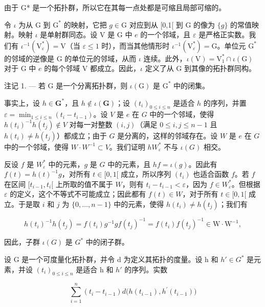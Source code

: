 由于 G* 是一个拓扑群，所以它在其每一点处都是可缩且局部可缩的。

令 \(\iota\) 为从 G 到 \(\mathrm{G}^*\) 的映射，它把 \(g\in \mathrm{G}\) 对应到从 [0,1[ 到 G 的像为 \(\{g\}\) 的常值映射。映射 \(\iota\) 是单射群同态。设 V 是 G 中 \(e\) 的一个邻域，且 \(\varepsilon\) 是严格正实数。我们有 \(\iota^{-1}(\mathrm{V}_{\varepsilon}^{*}) = \mathrm{V}\)（当 \(\varepsilon \leqslant 1\) 时），而当其他情形时 \(\iota^{-1}(\mathrm{V}_{\varepsilon}^{*}) = \mathrm{G}\)。单位元 \(\mathrm{G}^*\) 的邻域的逆像是 G 的单位元的邻域，从而 \(\iota\) 连续。此外，\(\iota(\mathrm{V}) = \mathrm{V}_1^* \cap \iota(\mathrm{G})\) 对于 G 中 \(e\) 的每个邻域 V 都成立。因此，\(\iota\) 定义了从 G 到其像的拓扑群同构。

注记 1. --- 若 G 是一个分离拓扑群，则 \(\iota(\mathrm{G})\) 是 \(\mathrm{G}^*\) 中的闭集。

事实上，设 \(h \in \mathbf{G}^*\)，且 \(h \notin \iota(\mathbf{G})\)；设 \((t_i)_{0 \leqslant i \leqslant n}\) 是适合 \(h\) 的序列，并置 \(\varepsilon = \min_{1 \leqslant i \leqslant n} (t_i - t_{i-1})\)。设 \(V\) 是 \(e\) 在 \(G\) 中的一个邻域，使得 \(h(t_i)^{-1}h(t_j) \notin V\) 对每一对整数 \((i,j)\)（满足 \(0 \leqslant i, j \leqslant n-1\) 且 \(h(t_i) \neq h(t_j)\)）都成立；由于 \(G\) 是分离的，这样的邻域存在。设 \(W\) 是 \(e\) 在 \(G\) 中的一个邻域，使得 \(W \cdot W^{-1} \subset V\)。我们证明 \(hW_\varepsilon^*\) 不与 \(\iota(G)\) 相交。

反设 \(f\) 是 \(W_{\varepsilon}^{*}\) 中的元素，\(g\) 是 \(G\) 中的元素，且 \(hf = \iota(g)\)。因此有 \(f(t) = h(t)^{-1}g\)，对所有 \(t \in [0,1[\) 成立，所以序列 \((t_i)\) 也适合函数 \(f\)。若 \(f\) 在区间 \([t_{i-1}, t_i[\) 上所取的值不属于 \(W\)，则有 \(t_i - t_{i-1} < \varepsilon\)，因为 \(f \in W_{\varepsilon}^{*}\)。但根据 \(\varepsilon\) 的定义，这个不等式不可能成立；因此都有 \(f(t) \in W\)，对于所有 \(t \in [0,1[\) 成立。于是取 \(i\) 和 \(j\) 为 \(\{0, \ldots, n-1\}\) 中的元素，使得 \(h(t_i) \neq h(t_j)\)；我们有

\[
h (t _ {i}) ^ {- 1} h (t _ {j}) = f (t _ {i}) g ^ {- 1} g f (t _ {j}) ^ {- 1} = f (t _ {i}) f (t _ {j}) ^ {- 1} \in \mathrm{W} \cdot \mathrm{W} ^ {- 1},
\]

因此，子群 \(\iota(G)\) 是 \(G^{*}\) 中的闭子群。

设 G 是一个可度量化拓扑群，并令 d 为定义其拓扑的度量。设 h 和 \(h' \in G^{*}\) 是元素，并设 \((t_{i})_{0 \leqslant i \leqslant n}\) 是适合 h 和 \(h'\) 的序列。实数

\[
\sum_ {i = 1} ^ {n} (t _ {i} - t _ {i - 1}) d \bigl (h (t _ {i - 1}), h ^ {\prime} (t _ {i - 1}) \bigr)
\]

